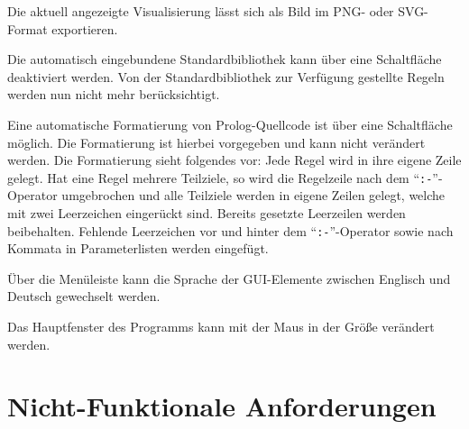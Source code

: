 \documentclass[parskip=full,11pt,twoside]{scrartcl}
\begin{document}
Die aktuell angezeigte Visualisierung lässt sich als Bild im PNG- oder SVG-Format exportieren.


Die automatisch eingebundene Standardbibliothek kann über eine Schaltfläche deaktiviert werden. Von der Standardbibliothek zur Verfügung gestellte Regeln werden nun nicht mehr berücksichtigt.


Eine automatische Formatierung von Prolog-Quellcode ist über eine Schaltfläche möglich. Die Formatierung ist hierbei vorgegeben und kann nicht verändert werden. Die Formatierung sieht folgendes vor: Jede Regel wird in ihre eigene Zeile gelegt. Hat eine Regel mehrere Teilziele, so wird die Regelzeile nach dem \enquote{\texttt{:-}}-Operator umgebrochen und alle Teilziele werden in eigene Zeilen gelegt, welche mit zwei Leerzeichen eingerückt sind. Bereits gesetzte Leerzeilen werden beibehalten. Fehlende Leerzeichen vor und hinter dem \enquote{\texttt{:-}}-Operator sowie nach Kommata in Parameterlisten werden eingefügt.


Über die Menüleiste kann die Sprache der GUI-Elemente zwischen Englisch und Deutsch gewechselt werden.


Das Hauptfenster des Programms kann mit der Maus in der Größe verändert werden.

\newpage
\section{Nicht-Funktionale Anforderungen}



\end{document}

